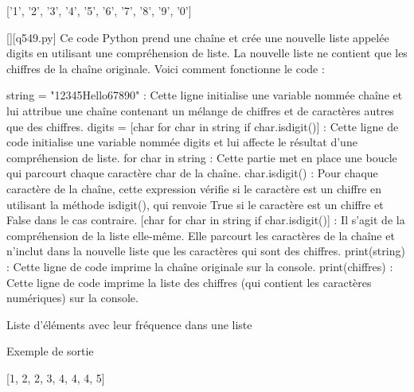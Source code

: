 ['1', '2', '3', '4', '5', '6', '7', '8', '9', '0']
        \par
        \begin{solution}
            \renewcommand{\nomfichier}{q549.py}
            \pythonfile{\chemincode \nomfichier}[][\nomfichier]
            Ce code Python prend une chaîne et crée une nouvelle liste appelée digits en utilisant une compréhension de liste. La nouvelle liste ne contient que les chiffres de la chaîne originale. Voici comment fonctionne le code :

    string = "12345Hello67890" : Cette ligne initialise une variable nommée chaîne et lui attribue une chaîne contenant un mélange de chiffres et de caractères autres que des chiffres.
    digits = [char for char in string if char.isdigit()] : Cette ligne de code initialise une variable nommée digits et lui affecte le résultat d'une compréhension de liste.
        for char in string : Cette partie met en place une boucle qui parcourt chaque caractère char de la chaîne.
        char.isdigit() : Pour chaque caractère de la chaîne, cette expression vérifie si le caractère est un chiffre en utilisant la méthode isdigit(), qui renvoie True si le caractère est un chiffre et False dans le cas contraire.
        [char for char in string if char.isdigit()] : Il s'agit de la compréhension de la liste elle-même. Elle parcourt les caractères de la chaîne et n'inclut dans la nouvelle liste que les caractères qui sont des chiffres.
    print(string) : Cette ligne de code imprime la chaîne originale sur la console.
    print(chiffres) : Cette ligne de code imprime la liste des chiffres (qui contient les caractères numériques) sur la console.
        \end{solution}
        

        \question
        Liste d'éléments avec leur fréquence dans une liste

Exemple de sortie

[1, 2, 2, 3, 4, 4, 4, 5]

